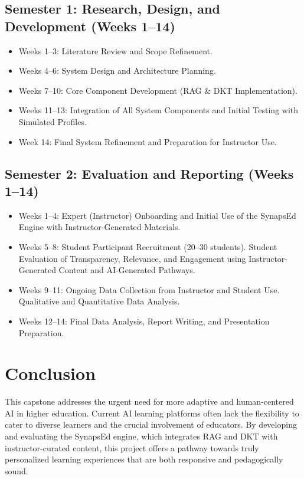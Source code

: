 \documentclass{stylefiles/capstone}
\begin{document}
\subsection*{Semester 1: Research, Design, and Development (Weeks 1--14)}
\begin{itemize}
  \item Weeks 1--3: Literature Review and Scope Refinement.
  \item Weeks 4--6: System Design and Architecture Planning.
  \item Weeks 7--10: Core Component Development (RAG \& DKT Implementation).
  \item Weeks 11--13: Integration of All System Components and Initial Testing with Simulated Profiles.
  \item Week 14: Final System Refinement and Preparation for Instructor Use.
\end{itemize}

\subsection*{Semester 2: Evaluation and Reporting (Weeks 1--14)}
\begin{itemize}
  \item Weeks 1--4: Expert (Instructor) Onboarding and Initial Use of the SynapsEd Engine with Instructor-Generated Materials.
  \item Weeks 5--8: Student Participant Recruitment (20--30 students). Student Evaluation of Transparency, Relevance, and Engagement using Instructor-Generated Content and AI-Generated Pathways.
  \item Weeks 9--11: Ongoing Data Collection from Instructor and Student Use. Qualitative and Quantitative Data Analysis.
  \item Weeks 12--14: Final Data Analysis, Report Writing, and Presentation Preparation.
\end{itemize}

\section{Conclusion}

This capstone addresses the urgent need for more adaptive and human-centered AI in higher education. Current AI learning platforms often lack the flexibility to cater to diverse learners and the crucial involvement of educators. By developing and evaluating the SynapsEd engine, which integrates RAG and DKT with instructor-curated content, this project offers a pathway towards truly personalized learning experiences that are both responsive and pedagogically sound.
\end{document}
